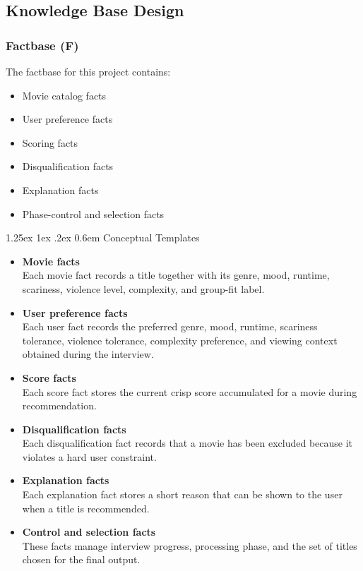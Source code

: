 \documentclass[11pt]{article}
\makeatletter
\renewcommand\paragraph{\@startsection{paragraph}{4}{\z@}%
  {1.25ex \@plus1ex \@minus.2ex}%
  {0.6em}%
  {\normalfont\normalsize\bfseries}}
\makeatother
\begin{document}
\subsection{Knowledge Base Design}

\subsubsection{Factbase (F)}
The factbase for this project contains:
\begin{itemize}
  \item Movie catalog facts
  \item User preference facts
  \item Scoring facts
  \item Disqualification facts
  \item Explanation facts
  \item Phase-control and selection facts
\end{itemize}

\paragraph{Conceptual Templates}
\begin{itemize}
  \item \textbf{Movie facts}\\
  Each movie fact records a title together with its genre, mood, runtime, scariness, violence level, complexity, and group-fit label.

  \item \textbf{User preference facts}\\
  Each user fact records the preferred genre, mood, runtime, scariness tolerance, violence tolerance, complexity preference, and viewing context obtained during the interview.

  \item \textbf{Score facts}\\
  Each score fact stores the current crisp score accumulated for a movie during recommendation.

  \item \textbf{Disqualification facts}\\
  Each disqualification fact records that a movie has been excluded because it violates a hard user constraint.

  \item \textbf{Explanation facts}\\
  Each explanation fact stores a short reason that can be shown to the user when a title is recommended.

  \item \textbf{Control and selection facts}\\
  These facts manage interview progress, processing phase, and the set of titles chosen for the final output.
\end{itemize}
\end{document}
